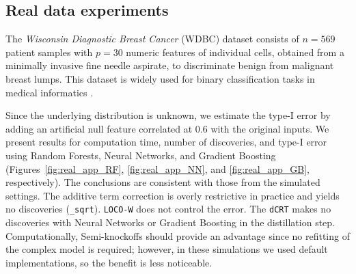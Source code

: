 \documentclass{article}
\theoremstyle{plain}
\theoremstyle{definition}
\theoremstyle{remark}
\begin{document}









\subsection{Real data experiments}\label{app:wdbc}


The \emph{Wisconsin Diagnostic Breast Cancer} (WDBC) dataset consists of $n=569$ patient samples with $p=30$ numeric features of individual cells, obtained from a minimally invasive fine needle aspirate, to discriminate benign from malignant breast lumps. This dataset is widely used for binary classification tasks in medical informatics \citep{wdbc1995}.

Since the underlying distribution is unknown, we estimate the type-I error by adding an artificial null feature correlated at $0.6$ with the original inputs. We present results for computation time, number of discoveries, and type-I error using Random Forests, Neural Networks, and Gradient Boosting (Figures~\ref{fig:real_app_RF}, \ref{fig:real_app_NN}, and \ref{fig:real_app_GB}, respectively). The conclusions are consistent with those from the simulated settings. The additive term correction is overly restrictive in practice and yields no discoveries (\texttt{\_sqrt}). \texttt{LOCO-W} does not control the error. The \texttt{dCRT} makes no discoveries with Neural Networks or Gradient Boosting in the distillation step. Computationally, Semi-knockoffs should provide an advantage since no refitting of the complex model is required; however, in these simulations we used default implementations, so the benefit is less noticeable.
\end{document}

